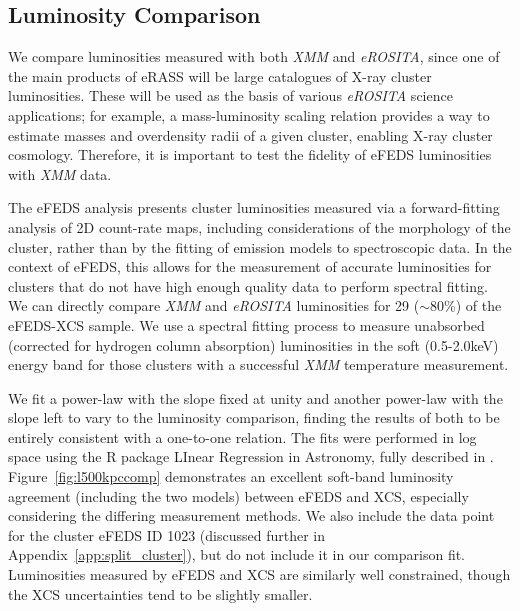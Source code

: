 \documentclass[fleqn,usenatbib]{mnras}
\begin{document}
\subsection{Luminosity Comparison}
\label{subsec:lumcomp}

We compare luminosities measured with both {\em XMM} and {\em eROSITA}, since one of the main products of eRASS will be large catalogues of X-ray cluster luminosities. These will be used as the basis of various {\em eROSITA} science applications; for example, a mass-luminosity scaling relation \citep[such as the one recently produced by][]{efedsmor} provides a way to estimate masses and overdensity radii of a given cluster, enabling X-ray cluster cosmology. Therefore, it is important to test the fidelity of eFEDS luminosities with {\em XMM} data. 

The eFEDS analysis presents cluster luminosities measured via a forward-fitting analysis of 2D count-rate maps, including considerations of the morphology of the cluster, rather than by the fitting of emission models to spectroscopic data. In the context of eFEDS, this allows for the measurement of accurate luminosities for clusters that do not have high enough quality data to perform spectral fitting. We can directly compare {\em XMM} and {\em eROSITA} luminosities for 29 (${\sim}$80\%) of the eFEDS-XCS sample. We use a spectral fitting process to measure unabsorbed (corrected for hydrogen column absorption) luminosities in the soft (0.5-2.0keV) energy band for those clusters with a successful {\em XMM} temperature measurement.


We fit a power-law with the slope fixed at unity and another power-law with the slope left to vary to the luminosity comparison, finding the results of both to be entirely consistent with a one-to-one relation. The fits were performed in log space using the R package LInear Regression in Astronomy\citep[{\sc lira}\footnote{\href{https://cran.r-project.org/web/packages/lira/index.html}{LInear Regression in Astronomy}}, ][]{softlira}, fully described in \cite{LIRA}. Figure~\ref{fig:l500kpccomp} demonstrates an excellent soft-band luminosity agreement (including the two models) between eFEDS and XCS, especially considering the differing measurement methods. We also include the data point for the cluster eFEDS ID 1023 (discussed further in Appendix~\ref{app:split_cluster}), but do not include it in our comparison fit. Luminosities measured by eFEDS and XCS are similarly well constrained, though the XCS uncertainties tend to be slightly smaller.
\end{document}
